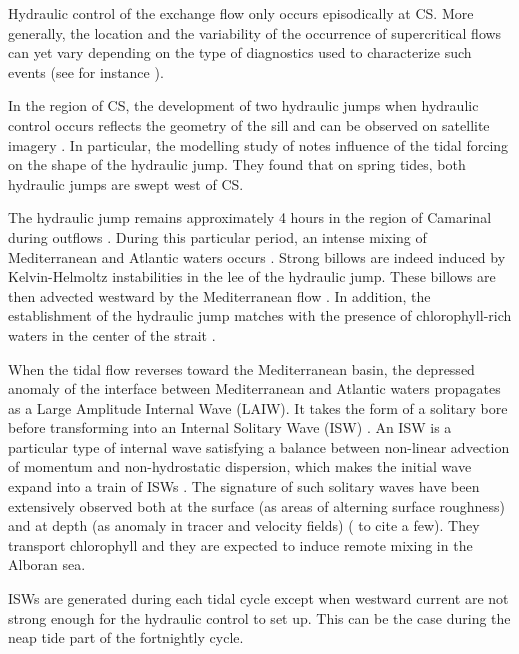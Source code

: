 Hydraulic control of the exchange flow only occurs episodically at CS. More generally, the location and the variability of the occurrence of supercritical flows can yet vary depending on the type of diagnostics used to characterize such events (see for instance \citet{armi_1988,vargas_2006,sannino_2007,sanchez-roman_2012}). 

In the region of CS, the development of two hydraulic jumps when hydraulic control occurs reflects the geometry of the sill and can be observed on satellite imagery \citep{brandt_1996,sanchez-garrido_2011}. In particular, the modelling study of \citet{sanchez-garrido_2011} notes influence of the tidal forcing on the shape of the hydraulic jump. They found that on spring tides, both hydraulic jumps are swept west of CS.

The hydraulic jump remains approximately 4 hours in the region of Camarinal during outflows \citep{armi_1988,vlasenko_2009}. During this particular period, an intense mixing of Mediterranean and Atlantic waters occurs \citep{wesson_1994,macias_2006,garcia-lafuente_2011}. Strong billows are indeed induced by Kelvin-Helmoltz instabilities in the lee of the hydraulic jump. These billows are then advected westward by the Mediterranean flow \citep{wesson_1994}. In addition, the establishment of the hydraulic jump matches with the presence of chlorophyll-rich waters in the center of the strait \citep{bruno_2013}.

When the tidal flow reverses toward the Mediterranean basin, the depressed anomaly of the interface between Mediterranean and Atlantic waters propagates as a Large Amplitude Internal Wave (LAIW). It takes the form of a solitary bore before transforming into an Internal Solitary Wave (ISW) \citep{armi_1988}. An ISW is a particular type of internal wave satisfying a balance between non-linear advection of momentum and non-hydrostatic dispersion, which makes the initial wave expand into a train of ISWs \citep{vlasenko_2000}. The signature of such solitary waves have been extensively observed both at the surface (as areas of alterning surface roughness) and at depth (as anomaly in tracer and velocity fields) (\citet{ziegenbein_1970,armi_1988,watson_1990,sanchezgarrido_2008} to cite a few). They transport chlorophyll \citep{bruno_2013} and they are expected to induce remote mixing in the Alboran sea.

ISWs are generated during each tidal cycle except when westward current are not strong enough for the hydraulic control to set up. This can be the case during the neap tide part of the fortnightly cycle\citep{watson_1990}.

